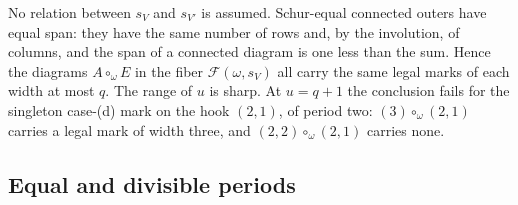 \documentclass[11pt,a4paper]{amsart}
\numberwithin{equation}{section}
\theoremstyle{plain}
\theoremstyle{definition}
\begin{document}
No relation between \(s_V\) and \(s_{V'}\) is assumed.  Schur-equal connected outers have equal span: they have the same number of rows \cite[Cor.~8.11]{Reiner2007Coincidences} and, by the involution, of columns, and the span of a connected diagram is one less than the sum.  Hence the diagrams \(A\circ_\omega E\) in the fiber \(\mathcal F(\omega,s_V)\) all carry the same legal marks of each width at most \(q\).  The range of \(u\) is sharp.  At \(u=q+1\) the conclusion fails for the singleton case-(d) mark on the hook \((2,1)\), of period two: \((3)\circ_\omega(2,1)\) carries a legal mark of width three, and \((2,2)\circ_\omega(2,1)\) carries none.

\subsection{Equal and divisible periods}
\end{document}
